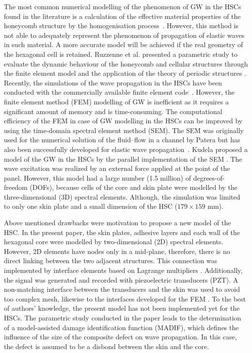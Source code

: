 \documentclass[sensors,article,submit,moreauthors,pdftex]{Definitions/mdpi}
\begin{document}
The most common numerical modelling of the phenomenon of GW in the HSCs found in the literature is a calculation of the effective material properties of the honeycomb structure by the homogenisation process~\cite{shi1995derivation, qi2008ultrasonic, mustapha2014leaky, baid2015dispersion, sikdar2016guided}.
However, this method is not able to adequately represent the phenomenon of propagation of elastic waves in such material.
A more accurate model will be achieved if the real geometry of the hexagonal cell is retained.
Ruzzenne et al. presented a parametric study to evaluate the dynamic behaviour of the honeycomb and cellular structures through the finite element model and the application of the theory of periodic structures \cite{ruzzene2003wave}.
Recently, the simulations of the wave propagation in the HSCs have been conducted with the commercially available finite element code~\cite{song2009guided, hosseini2013numerical, tian2015wavenumber, zhao2018wave}.
However, the finite element method (FEM) modelling of GW is inefficient as it requires a significant amount of memory and is time-consuming.
The computational efficiency of the FEM in case of GW modelling in the HSCs can be improved by using the time-domain spectral element method (SEM).
The SEM was originally used for the numerical solution of the fluid--flow in a channel by Patera \cite{patera1984spectral} but has also been successfully developed for elastic wave propagation~\cite{ostachowicz2011guided}.
Kudela proposed a model of the GW in the HSCs by the parallel implementation of the SEM \cite{kudela2016parallel}.
The wave excitation was realized by an external force applied at the point of the panel.
However, this model had a large number (1.5 million) of degrees-of-freedom (DOFs), because cells of the core and skin plate were modelled by the three-dimensional (3D) spectral elements.
Although, the simulation was limited to only one skin plate and a small dimension of the HSC (\(179 \times 159 \) mm).

Above mentioned drawbacks were motivation to propose a new model of the HSC.
In the present paper, the skin plates, adhesive layers and each wall of the hexagonal core were modelled by two-dimensional (2D) spectral elements.
However, 2D elements have nodes only in a mid-plane, therefore, there is no direct linking between the two adjacent structures.
This connection was implemented by interface elements based on Lagrange multipliers \cite{ashwin2014formulation, fiborek20192d}.
Additionally, the signal was generated and recorded with piezoelectric transducers (PZT).
A non-matching interface between the transducers and the skin was used to avoid too complex mesh, likewise to the interfaces developed for the FEM \cite{flemisch2000elasto, flemisch2012non}. 
To the best of authors’ knowledge, the present model has not been implemented yet for the HSCs.
The parametric study conducted in the paper leads to the determination of a model-assisted damage identification function (MADIF), which defines the influence of the size of the composite defect on wave propagation.
In this case, the defect is assumed to be a disbond between the skin and the core.
\end{document}
